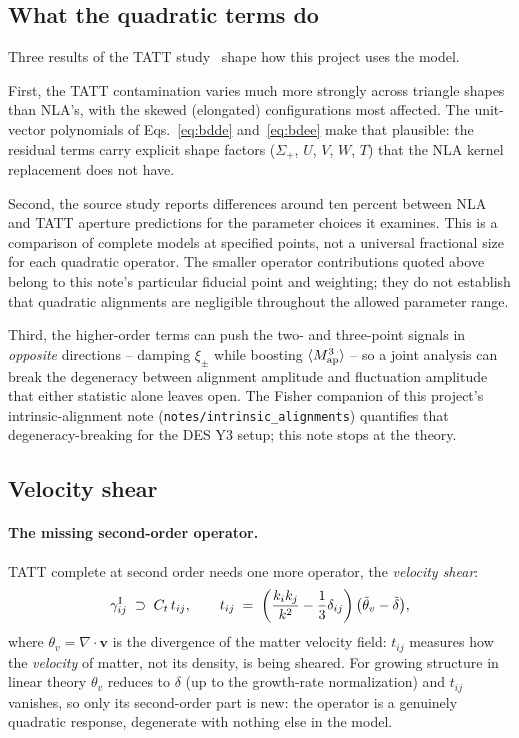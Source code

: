 \documentclass[11pt]{article}
\newcommand{\Map}{M_{\rm ap}}
\newcommand{\us}{\_\allowbreak}
\numberwithin{equation}{section}
\begin{document}
\subsection{What the quadratic terms do}
\label{sec:iaresults}

Three results of the TATT study~\cite{GomesTATT} shape how this
project uses the model.

First, the TATT contamination varies much more strongly across
triangle shapes than NLA's, with the skewed (elongated)
configurations most affected.  The unit-vector polynomials of
Eqs.~\eqref{eq:bdde} and~\eqref{eq:bdee} make that plausible: the
residual terms carry explicit shape factors ($\Sigma_+$, $U$, $V$,
$W$, $T$) that the NLA kernel replacement does not have.

Second, the source study reports differences around ten percent between
NLA and TATT aperture predictions for the parameter choices it examines.
This is a comparison of complete models at specified points, not a
universal fractional size for each quadratic operator. The smaller
operator contributions quoted above belong to this note's particular
fiducial point and weighting; they do not establish that quadratic
alignments are negligible throughout the allowed parameter range.

Third, the higher-order terms can push the two- and three-point
signals in \emph{opposite} directions -- damping $\xi_\pm$ while
boosting $\langle\Map^3\rangle$ -- so a joint analysis can break the
degeneracy between alignment amplitude and fluctuation amplitude
that either statistic alone leaves open.  The Fisher companion of
this project's intrinsic-alignment note
(\texttt{notes/intrinsic\us alignments}) quantifies that
degeneracy-breaking for the DES Y3 setup; this note stops at the
theory.

\subsection{Velocity shear}
\label{sec:velocityshear}

\paragraph{The missing second-order operator.}
TATT complete at second order needs one more operator, the
\emph{velocity shear}:
\begin{equation}
  \gamma^{\rm I}_{ij}
  \;\supset\; C_t\, t_{ij},
  \qquad
  t_{ij} \;=\;
  \left(\frac{k_i k_j}{k^2} - \frac{1}{3}\delta_{ij}\right)
  \bigl(\tilde\theta_v - \tilde\delta\bigr) ,
  \label{eq:vsdef}
\end{equation}
where $\theta_v = \nabla\!\cdot\!\boldsymbol{v}$ is the divergence
of the matter velocity field: $t_{ij}$ measures how the
\emph{velocity} of matter, not its density, is being sheared.  For
growing structure in linear theory $\theta_v$ reduces to $\delta$
(up to the growth-rate normalization) and $t_{ij}$ vanishes, so only
its second-order part is new: the operator is a genuinely quadratic
response, degenerate with nothing else in the model.
\end{document}

